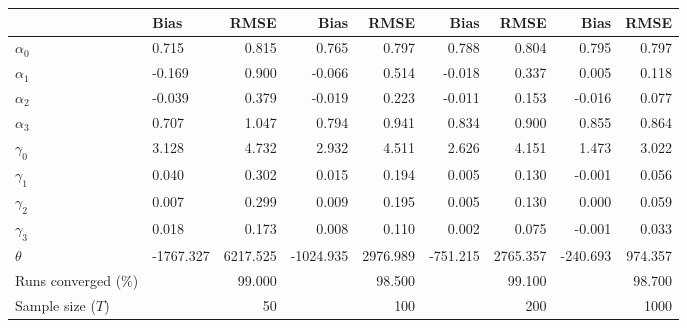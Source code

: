 
\begin{tabular}[t]{llrrrrrrr}
\toprule
  & Bias & RMSE & Bias & RMSE & Bias & RMSE & Bias & RMSE\\
\midrule
$\alpha_{0}$ & 0.715 & 0.815 & 0.765 & 0.797 & 0.788 & 0.804 & 0.795 & 0.797\\
$\alpha_{1}$ & -0.169 & 0.900 & -0.066 & 0.514 & -0.018 & 0.337 & 0.005 & 0.118\\
$\alpha_{2}$ & -0.039 & 0.379 & -0.019 & 0.223 & -0.011 & 0.153 & -0.016 & 0.077\\
$\alpha_{3}$ & 0.707 & 1.047 & 0.794 & 0.941 & 0.834 & 0.900 & 0.855 & 0.864\\
$\gamma_{0}$ & 3.128 & 4.732 & 2.932 & 4.511 & 2.626 & 4.151 & 1.473 & 3.022\\
$\gamma_{1}$ & 0.040 & 0.302 & 0.015 & 0.194 & 0.005 & 0.130 & -0.001 & 0.056\\
$\gamma_{2}$ & 0.007 & 0.299 & 0.009 & 0.195 & 0.005 & 0.130 & 0.000 & 0.059\\
$\gamma_{3}$ & 0.018 & 0.173 & 0.008 & 0.110 & 0.002 & 0.075 & -0.001 & 0.033\\
$\theta$ & -1767.327 & 6217.525 & -1024.935 & 2976.989 & -751.215 & 2765.357 & -240.693 & 974.357\\
Runs converged (\%) &  & 99.000 &  & 98.500 &  & 99.100 &  & 98.700\\
Sample size ($T$) &  & 50 &  & 100 &  & 200 &  & 1000\\
\bottomrule
\end{tabular}
